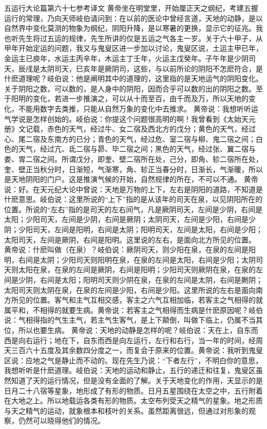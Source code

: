 \documentclass[12pt,UTF8]{ctexbook}
\begin{document}
五运行大论篇第六十七参考译文
黄帝坐在明堂里，开始厘正天之纲纪，考建五握运行的常理，乃向天师岐伯请问到：在以前的医论中曾经言道，天地的动静，是以自然界中变化莫测的物象为纲纪，阴阳升降，是以寒暑的更换，显示它的征兆。我也听先生将过五运的规律，先生所讲的仅是五运之气各主一岁。关于六十甲子，从甲年开始定运的问题，我又与鬼叟区进一步加以讨论，鬼叟区说，土运主甲已年，金运主已庾年，水运主丙辛年，木运主丁壬年，火运主戊癸年。子午年是少阴司天，辰戌是太阴司天，巳亥年是厥阴司，这些，与以前所论的阴阳不怎麽符合，是什麽道理呢？岐伯说：他是阐明其中的道理的，这里指的是天地运气的阴阳变化。关于阴阳之数，可以数的，是人身中的阴阳，因而合乎可以数的出的阴阳之数。至于阳明的变化，若进一步推演之，可以从十而至百，由千而及万，所以天地的变化，不能用数字去类推，只能从自然万象的变化中去推求。
黄帝说：我想听听运气学说是怎样创始的。岐伯说：你提这个问题很高明的啊！我曾看到《太始天元册》文记载，赤色的天气，经过牛、女二宿及西北方的戊分；黄色的天气，经过心、尾二宿及东南方的已分；青色的天气，经过危、室二宿与柳、鬼二宿之间；白色的天气，经过亢、氐二宿与昴、毕二宿之间；黑色的天气，经过张、翼二宿与娄、胃二宿之间。所谓戊分，即奎、壁二宿所在处，己分，即角、轸二宿所在处，奎、壁正当秋分时，日渐短，气渐寒，角、轸正当春分时，日渐长，气渐暖，所以是天地阴阳的门户。这是推演气候的开始，自然规律的所在，不可以不通。
黄帝说：好。在天元纪大论中曾说：天地是万物的上下，左右是阴阳的道路，不知道是什麽意思。岐伯说：这里所说的“上下”指的是从该年的司天在泉，以见阴阳所在的位置。所说的“左右”指的是司天的左右间气，凡是厥阴司天，左间是少阴，右间是太阳；少阳司天，左间是少阴，右间是厥阴；太阴司天，左间是少阳，右间是少阴；少阳司天，左间是阳明，右间是太阴；阳明司天，左间是太阳，右间是少阳；太阳司天，左间是厥阴，右间是阳明。这里说的左右，是面向北方所见的位置。
黄帝说：什麽叫做（在泉）？岐伯说：厥阴司天，则少阳在泉，在泉的左间是阳明，右间是太阴；少阳司天则阳明在泉，在泉的左间是太阳，右间是少阳；太阴司天则太阳在泉，在泉的左间是厥阴，右间是阳明；少阳司天则厥阴在泉，在泉的左间是少阴，右间是太阳；阳明司天则少阴在泉，在泉的左间是太阴，右间是劂阴；太阳司天则太阴在泉，在泉的左间是少阳，右间是少阳。这里所说的左右是面向南方所见的位置。客气和主气互相交感，客主之六气互相加临，若客主之气相得的就属平和，不相得的就要生病。黄帝说：若客主之气相得而生病是什麽原因呢？岐伯说：气相得指的气生主气，若主气生客气，是上下颠倒，叫做下临上，仍属不当其位，所以也要生病。
黄帝说：天地的动静是怎样的呢？岐伯说：天在上，自东而西是向右运行；地在下，自东而西是向左运行，左行和右行，当一年的时间，经周天三百六十五度及其余数四分度之一，而复会于原来的位置。黄帝说：我听到鬼叟区说：应地之气是静止而不动的。现在先生乃说：“下者左行”，不明白你的意思，我想听听是什麽道理。岐伯说：天地的运动和静止，五行的递迁和往复，鬼叟区虽然知道了天的运行情况，但是没有全面的了解。关于天地变化的作用，天显示的是日月二十八宿等星象，地形成了有形的物质。日月五星围绕在太空之中，五行附着在大地之上。所以地载运各类有形的物质。太空布列受天之精气的星象。地之形质与天之精气的运动，就象根本和枝叶的关系。虽然距离很远，但通过对形象的观察，仍然可以晓得他们的情况。
\end{document}
